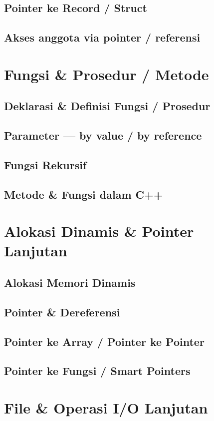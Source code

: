 \documentclass[12pt,a4paper]{book}
\begin{document}
\section{Pointer ke Record / Struct}
\section{Akses anggota via pointer / referensi}

\chapter{Fungsi \& Prosedur / Metode}
\section{Deklarasi \& Definisi Fungsi / Prosedur}
\section{Parameter — by value / by reference}
\section{Fungsi Rekursif}
\section{Metode \& Fungsi dalam C++}

\chapter{Alokasi Dinamis \& Pointer Lanjutan}
\section{Alokasi Memori Dinamis}
\section{Pointer \& Dereferensi}
\section{Pointer ke Array / Pointer ke Pointer}
\section{Pointer ke Fungsi / Smart Pointers}

\chapter{File \& Operasi I/O Lanjutan}
\end{document}
